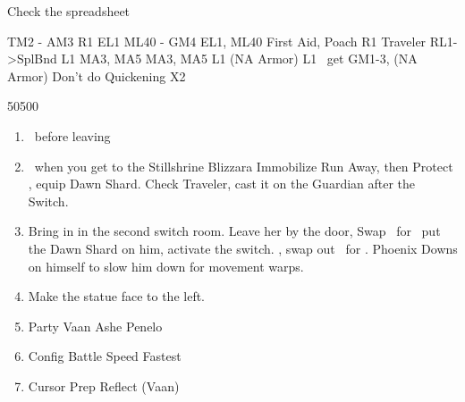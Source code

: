 \begin{liscense}
Check the spreadsheet

				TM2 - AM3	
				R1	EL1
					ML40 - GM4
					EL1, ML40
First Aid, Poach					R1
Traveler					
RL1->SplBnd					
L1					MA3, MA5
				MA3, MA5	L1
			(NA Armor)	L1	
\balthier\ get GM1-3, (NA Armor)
Don't do Quickening X2	
\end{liscense}
\begin{shop}{50500}
\end{shop}
\begin{enumerate}
\item \save\ before leaving
\item \save\ when you get to the Stillshrine
\ashef Blizzara \penelo
\penelof Immobilize \penelo
\vaanf Run Away, then Protect \vaan, equip Dawn Shard. Check Traveler, cast it on the Guardian after the Switch.
\item Bring in \penelo in the second switch room. Leave her by the door, Swap \vaan\ for \balthier\, put the Dawn Shard on him, activate the switch. \leader{\penelo}, swap out \penelo\ for \vaan.
\balthierf Phoenix Downs on himself to slow him down for movement warps.
\item Make the statue face to the left.
\item Party	Vaan	Ashe	Penelo		
\item Config	Battle Speed	Fastest		
\item Cursor	Prep Reflect (Vaan)	
\end{enumerate}

